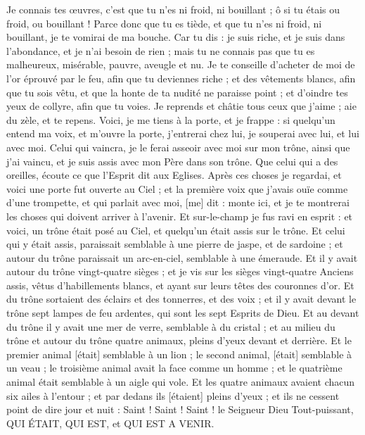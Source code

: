 \begin{multicols}{2}
Je connais tes œuvres, c'est que tu n'es ni froid, ni bouillant ; ô si tu étais ou froid, ou bouillant !
Parce donc que tu es tiède, et que tu n'es ni froid, ni bouillant, je te vomirai de ma bouche.
Car tu dis : je suis riche, et je suis dans l'abondance, et je n'ai besoin de rien ; mais tu ne connais pas que tu es malheureux, misérable, pauvre, aveugle et nu.
Je te conseille d'acheter de moi de l'or éprouvé par le feu, afin que tu deviennes riche ; et des vêtements blancs, afin que tu sois vêtu, et que la honte de ta nudité ne paraisse point ; et d'oindre tes yeux de collyre, afin que tu voies.
Je reprends et châtie tous ceux que j'aime ; aie du zèle, et te repens.
Voici, je me tiens à la porte, et je frappe : si quelqu'un entend ma voix, et m'ouvre la porte, j'entrerai chez lui, je souperai avec lui, et lui avec moi.
Celui qui vaincra, je le ferai asseoir avec moi sur mon trône, ainsi que j'ai vaincu, et je suis assis avec mon Père dans son trône.
Que celui qui a des oreilles, écoute ce que l'Esprit dit aux Eglises.
\VerseOne{}Après ces choses je regardai, et voici une porte fut ouverte au Ciel ; et la première voix que j'avais ouïe comme d'une trompette, et qui parlait avec moi, [me] dit : monte ici, et je te montrerai les choses qui doivent arriver à l'avenir.
Et sur-le-champ je fus ravi en esprit : et voici, un trône était posé au Ciel, et quelqu'un était assis sur le trône.
Et celui qui y était assis, paraissait semblable à une pierre de jaspe, et de sardoine ; et autour du trône paraissait un arc-en-ciel, semblable à une émeraude.
Et il y avait autour du trône vingt-quatre sièges ; et je vis sur les sièges vingt-quatre Anciens assis, vêtus d'habillements blancs, et ayant sur leurs têtes des couronnes d'or.
Et du trône sortaient des éclairs et des tonnerres, et des voix ; et il y avait devant le trône sept lampes de feu ardentes, qui sont les sept Esprits de Dieu.
Et au devant du trône il y avait une mer de verre, semblable à du cristal ; et au milieu du trône et autour du trône quatre animaux, pleins d'yeux devant et derrière.
Et le premier animal [était] semblable à un lion ; le second animal, [était] semblable à un veau ; le troisième animal avait la face comme un homme ; et le quatrième animal était semblable à un aigle qui vole.
Et les quatre animaux avaient chacun six ailes à l'entour ; et par dedans ils [étaient] pleins d'yeux ; et ils ne cessent point de dire jour et nuit : Saint ! Saint ! Saint ! le Seigneur Dieu Tout-puissant, QUI ÉTAIT, QUI EST, et QUI EST A VENIR.

\end{multicols}
